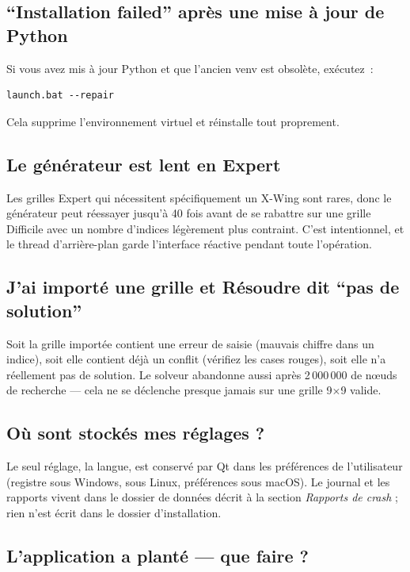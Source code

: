 \subsection{``Installation failed'' après une mise à jour de Python}

Si vous avez mis à jour Python et que l'ancien venv est obsolète,
exécutez~:

\begin{lstlisting}
launch.bat --repair
\end{lstlisting}

Cela supprime l'environnement virtuel et réinstalle tout proprement.

\subsection{Le générateur est lent en Expert}

Les grilles Expert qui nécessitent spécifiquement un X-Wing sont rares,
donc le générateur peut réessayer jusqu'à 40 fois avant de se rabattre
sur une grille Difficile avec un nombre d'indices légèrement plus
contraint. C'est intentionnel, et le thread d'arrière-plan garde
l'interface réactive pendant toute l'opération.

\subsection{J'ai importé une grille et Résoudre dit ``pas de solution''}

Soit la grille importée contient une erreur de saisie (mauvais chiffre
dans un indice), soit elle contient déjà un conflit (vérifiez les cases
rouges), soit elle n'a réellement pas de solution. Le solveur abandonne
aussi après 2\,000\,000 de n\oe uds de recherche --- cela ne se
déclenche presque jamais sur une grille 9$\times$9 valide.

\subsection{Où sont stockés mes réglages ?}

Le seul réglage, la langue, est conservé par Qt dans les préférences de
l'utilisateur (registre sous Windows,  sous
Linux, préférences sous macOS). Le journal et les rapports vivent dans le
dossier de données décrit à la section \emph{Rapports de crash} ; rien n'est
écrit dans le dossier d'installation.

\subsection{L'application a planté --- que faire ?}

